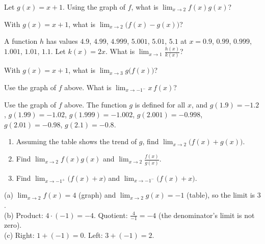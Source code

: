 \fgraph
\begin{exo}{}
Let $g(x)=x+1$. Using the graph of $f$, what is $\displaystyle\lim_{x\to2}f(x)g(x)$?
\end{exo}
\begin{exo}{}
With $g(x)=x+1$, what is $\displaystyle\lim_{x\to2}\big(f(x)-g(x)\big)$?
\end{exo}
\begin{exo}{}
A function $h$ has values $4.9$, $4.99$, $4.999$, $5.001$, $5.01$, $5.1$ at $x=0.9$, $0.99$, $0.999$, $1.001$, $1.01$, $1.1$. Let $k(x)=2x$. What is $\displaystyle\lim_{x\to1}\frac{h(x)}{k(x)}$?
\end{exo}
\begin{exo}{}
With $g(x)=x+1$, what is $\displaystyle\lim_{x\to3}g\big(f(x)\big)$?
\end{exo}
\begin{exo}[graph]{}
\begin{minipage}{\linewidth}
Use the graph of $f$ above. What is $\displaystyle\lim_{x\to-1^-}x\,f(x)$?

\end{minipage}
\end{exo}
\begin{exo}{}
Use the graph of $f$ above. The function $g$ is defined for all $x$, and $g(1.9)=-1.2$, $g(1.99)=-1.02$, $g(1.999)=-1.002$, $g(2.001)=-0.998$, $g(2.01)=-0.98$, $g(2.1)=-0.8$.
\begin{enumerate}[label=(\alph*)]
\item Assuming the table shows the trend of $g$, find $\displaystyle\lim_{x\to2}\big(f(x)+g(x)\big)$.
\item Find $\displaystyle\lim_{x\to2}f(x)g(x)$ and $\displaystyle\lim_{x\to2}\frac{f(x)}{g(x)}$.
\item Find $\displaystyle\lim_{x\to-1^+}\big(f(x)+x\big)$ and $\displaystyle\lim_{x\to-1^-}\big(f(x)+x\big)$.
\end{enumerate}
\begin{solution}
(a) $\lim_{x\to2}f(x)=4$ (graph) and $\lim_{x\to2}g(x)=-1$ (table), so the limit is $3$.\\
(b) Product: $4\cdot(-1)=-4$. Quotient: $\frac{4}{-1}=-4$ (the denominator's limit is not zero).\\
(c) Right: $1+(-1)=0$. Left: $3+(-1)=2$.
\end{solution}
\end{exo}

